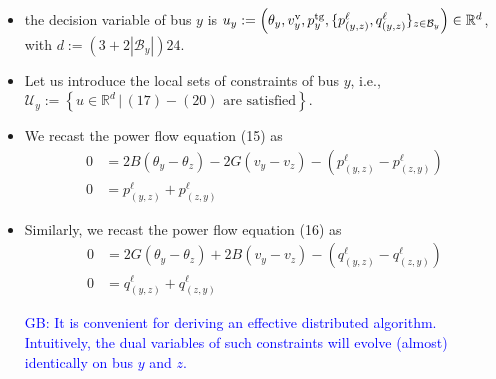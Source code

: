 \documentclass[10pt]{article}
\newtheorem{definitiox	n}{Definition}{\it}{}
\newcommand{\mc}{\mathcal}
\newcommand{\bb}{\mathbb}
\newcommand{\R}{\bb R}
\newcommand{\blue}{\textcolor{blue}}
\newcommand{\0}{\mathbf{0}}
\newcommand{\1}{\mathbf{1}}
\begin{document}
\begin{itemize}
\item the decision variable of bus $y$ is $u_y := \left(
\theta_y, v^{\text v}_y, p_y^{\text{tg}},
\{ 
p^\ell_{(y,z)}, q^{\ell}_{(y,z)} 
\}_{z \in \mc B_y}
\right) \in \mathbb R^{d}$, with $d:= (3+2 |\mc B_y| )24$.

\item
Let us introduce the local sets of constraints of bus $y$, i.e.,
$\mc U_y := \left\{
u \in \R^d \, | \, (17)-(20) \text{ are satisfied}
\right\}.
$

\item We recast the power flow equation (15) as
\begin{align*}
0 &= 2B(\theta_y-\theta_z) - 2G( v_y - v_z) - (p^{\ell}_{(y,z)} - p^{\ell}_{(z,y)})\\
0 &= p^\ell_{(y,z)} + p^\ell_{(z,y)}
\end{align*}

\item Similarly, we recast the power flow equation (16) as
\begin{align*}
0 &= 2G(\theta_y-\theta_z) + 2B( v_y - v_z) - (q^{\ell}_{(y,z)} - q^{\ell}_{(z,y)})\\
0 &= q^\ell_{(y,z)} + q^\ell_{(z,y)}
\end{align*}

\blue{GB:
It is convenient for deriving an effective distributed algorithm. Intuitively, the dual variables of such constraints will evolve (almost) identically on bus $y$ and $z$.
}
\end{itemize}
\end{document}
